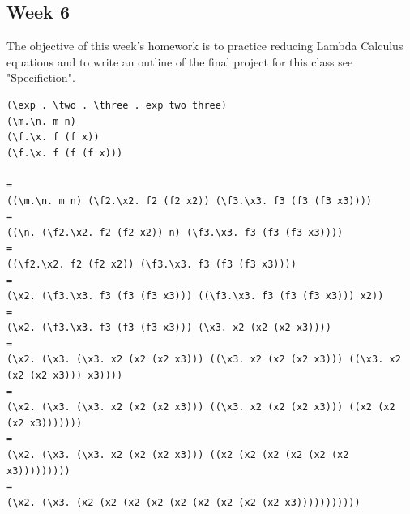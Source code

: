 \documentclass{article}
\theoremstyle{theorem}
\theoremstyle{definition}
\theoremstyle{remark}
\begin{document}
\subsection{Week 6}
The objective of this week's homework is to practice reducing Lambda Calculus equations and to write an outline of the final project for this class see "Specifiction". \\
\begin{lstlisting}
(\exp . \two . \three . exp two three)
(\m.\n. m n)
(\f.\x. f (f x))
(\f.\x. f (f (f x)))

=
((\m.\n. m n) (\f2.\x2. f2 (f2 x2)) (\f3.\x3. f3 (f3 (f3 x3))))
=
((\n. (\f2.\x2. f2 (f2 x2)) n) (\f3.\x3. f3 (f3 (f3 x3))))
=
((\f2.\x2. f2 (f2 x2)) (\f3.\x3. f3 (f3 (f3 x3))))
=
(\x2. (\f3.\x3. f3 (f3 (f3 x3))) ((\f3.\x3. f3 (f3 (f3 x3))) x2))
=
(\x2. (\f3.\x3. f3 (f3 (f3 x3))) (\x3. x2 (x2 (x2 x3))))
=
(\x2. (\x3. (\x3. x2 (x2 (x2 x3))) ((\x3. x2 (x2 (x2 x3))) ((\x3. x2 (x2 (x2 x3))) x3))))
=
(\x2. (\x3. (\x3. x2 (x2 (x2 x3))) ((\x3. x2 (x2 (x2 x3))) ((x2 (x2 (x2 x3)))))))
=
(\x2. (\x3. (\x3. x2 (x2 (x2 x3))) ((x2 (x2 (x2 (x2 (x2 (x2 x3)))))))))
=
(\x2. (\x3. (x2 (x2 (x2 (x2 (x2 (x2 (x2 (x2 (x2 x3)))))))))))
\end{lstlisting}
\end{document}
